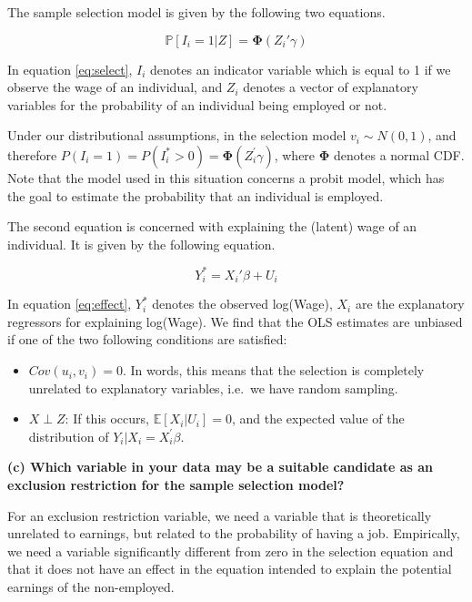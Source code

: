 \documentclass[
]{article}
\providecommand{\tightlist}{%
  \setlength{\itemsep}{0pt}\setlength{\parskip}{0pt}}
\begin{document}
The sample selection model is given by the following two equations.

\begin{equation}
\mathbb{P}[I_i=1|Z]=\mathbf{\Phi} (Z_i'\gamma)
\label{eq:select}
\end{equation}

In equation \ref{eq:select}, \(I_i\) denotes an indicator variable which
is equal to 1 if we observe the wage of an individual, and \(Z_i\)
denotes a vector of explanatory variables for the probability of an
individual being employed or not.

Under our distributional assumptions, in the selection model
\(v_i \sim N(0,1)\), and therefore
\(P(I_i=1) = P(I_i^* > 0) = \mathbf{\Phi}(Z_i^{'} \gamma)\), where
\(\mathbf{\Phi}\) denotes a normal CDF. Note that the model used in this
situation concerns a probit model, which has the goal to estimate the
probability that an individual is employed.

The second equation is concerned with explaining the (latent) wage of an
individual. It is given by the following equation.

\begin{equation}
Y_i^* = X_i'\beta + U_i
\label{eq:effect}
\end{equation}

In equation \ref{eq:effect}, \(Y_i^*\) denotes the observed log(Wage),
\(X_i\) are the explanatory regressors for explaining log(Wage). We find
that the OLS estimates are unbiased if one of the two following
conditions are satisfied:

\begin{itemize}
\tightlist
\item
  \(Cov(u_i, v_i) = 0\). In words, this means that the selection is
  completely unrelated to explanatory variables, i.e.~we have random
  sampling.
\item
  \(X \perp Z\): If this occurs, \(\mathbb{E}[X_i|U_i] = 0\), and the
  expected value of the distribution of \(Y_i|X_i = X_i^{'} \beta\).
\end{itemize}

\textbf{(c) Which variable in your data may be a suitable candidate as
an exclusion restriction for the sample selection model?}

For an exclusion restriction variable, we need a variable that is
theoretically unrelated to earnings, but related to the probability of
having a job. Empirically, we need a variable significantly different
from zero in the selection equation and that it does not have an effect
in the equation intended to explain the potential earnings of the
non-employed.
\end{document}
